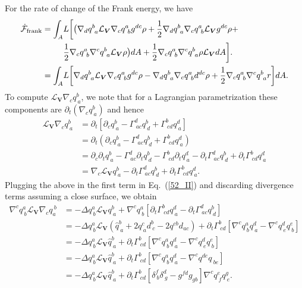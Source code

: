 For the rate of change of the Frank energy, we have %
\begin{align} 
	\dot{\mathcal{F}}_{\rm frank}  =  {\int_A} \nonumber & L \bigg[\big( \nabla_d  q^b_{~a}\mathcal{L}_{\bm{V}} \nabla_c q^{a}_{~b}g^{dc} \rho  + \frac{1}{2}\nabla_d q^b_{~ a} \nabla_c q^{a}_{~b}\mathcal{L}_{\bm{V}}  g^{dc} \rho + \\ & \frac{1}{2} \nabla_c q^{a}_{~ b}  \nabla^c q^{b}_{~ a} \mathcal{L}_{\bm{V}} \rho  \big) d A    + \frac{1}{2} \nabla_c q^{a}_{~b}  \nabla^c q^{b}_{~ a} \rho \mathcal{L}_{\bm{V}} d A \bigg]. \nonumber\\
	=  {\int_A}&  L \bigg[\nabla_d q^b_{~ a}\mathcal{L}_{\bm{V}} \nabla_c q^{a}_{~ b}g^{dc}  \rho   - \nabla_d q^b_{~ a} \nabla_c q^{a}_{~ b}  d^{dc}  \rho + \frac{1}{2} \nabla_c q^{a}_{~ b}  \nabla^c q^{b}_{~ a} r  \bigg]d A \label{52_II}.
\end{align}
To compute $\mathcal{L}_{\bm{V}}  \nabla_c q^{b}_{~a}$, we note that for a Lagrangian parametrization these components are  $\partial_t \left(\nabla_c q^{b}_{~a}\right)$ and hence 
\begin{align}  \label{53_II}
	\mathcal{L}_{\bm{V}}  \nabla_c q^{b}_{~a} & =  \partial_t \left[\partial_c q_{~a}^b - \Gamma^d_{~ ac} q_{~d}^b + \Gamma^b_{~cd} q_{~a}^d\right] \\ 
	& = \nonumber \partial_t (\partial_c q_{~a}^b - \Gamma^d_{~ac} q_{~d}^b + \Gamma^b_{~cd} q_{~a}^d) \\ \nonumber
	& =  \partial_c \partial_t q_{~a}^b - \Gamma^d_{~ac} \partial_t q_{~d}^b - \Gamma^b_{~cd} \partial_t q_{~a}^d - \partial_t \Gamma^d_{~ac} q_{~d}^b + \partial_t \Gamma^b_{~cd} q_{~a}^d  \\ \nonumber
	& =  \nabla_c \mathcal{L}_{\bm{V}} q_{~a}^b - \partial_t \Gamma^d_{~ac} q_{~d}^b + \partial_t \Gamma^b_{~cd} q_{~a}^d.
\end{align}
Plugging the above in the first term in Eq.~(\ref{52_II}) and discarding divergence terms assuming a close surface, we obtain
\begin{align}  \label{54_II}
	\nabla^c q^a_{~b} \mathcal{L}_{\bm{V}} \nabla_c q^{~b}_{a}   &= 
	-\Delta q^{a}_{~ b}\mathcal{L}_{\bm{V}} q_{~a}^b + \nabla^c q^{a}_{~ b} \left[\partial_t \Gamma^b_{~cd} q_{~a}^d- \partial_t \Gamma^d_{~ac} q_{~d}^b\right]  \nonumber \\ 
	& =  -\Delta q^{a}_{~ b}\mathcal{L}_{\bm{V}}  \left(\widehat{q}_{~a}^b + 2q_{~a}^c  d_{~c}^b - 2q^{cb}  d_{ac} \right)  \nonumber+  \partial_t \Gamma^b_{~cd} \left[ \nabla^c q^a_{~b}  q_{~a}^d- \nabla^c q^d_{~ e}  q_{~b}^e \right]  \nonumber \\
	& =  -\Delta q^{a}_{~ b}\mathcal{L}_{\bm{V}}  \widehat{q}_{~a}^b +   \partial_t \Gamma^b_{~cd} \left[ \nabla^c q^a_{~b}  q_{~a}^d- \nabla^c q^d_{~ e}  q_{~b}^e \right] \nonumber  \\ 
	& =  -\Delta q^{a}_{~ b}\mathcal{L}_{\bm{V}}  \widehat{q}_{~a}^b +   \partial_t \Gamma^b_{~cd} \left[ \nabla^c q^a_{~b}  q_{~a}^d- \nabla^c q^{de}  q_{~be} \right] \nonumber  \\ 
	&=  -\Delta q^{a}_{~ b}\mathcal{L}_{\bm{V}} \widehat{q}_{~a}^b + \partial_t \Gamma^b_{~cd} \left[ \delta_{~b}^f \delta_{~g}^d - g^{fd} g_{gb} \right] \nabla^c q^e_{~f} q_{~e}^g.
\end{align}
